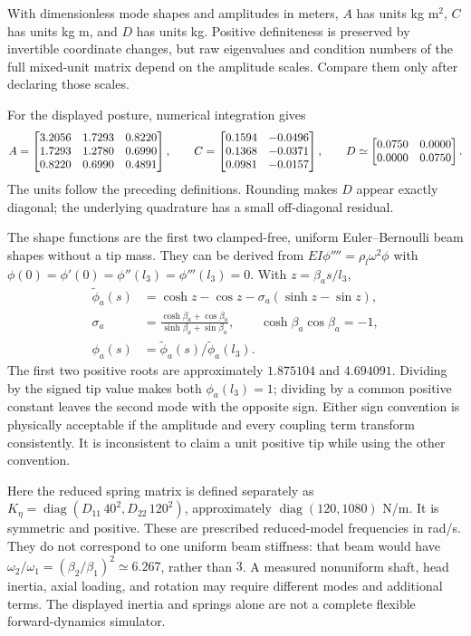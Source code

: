 With dimensionless mode shapes and amplitudes in meters, $A$ has units kg m$^2$, $C$ has units kg m, and $D$ has units kg. Positive definiteness is preserved by invertible coordinate changes, but raw eigenvalues and condition numbers of the full mixed-unit matrix depend on the amplitude scales. Compare them only after declaring those scales.

For the displayed posture, numerical integration gives
\begin{equation}
 A=\begin{bmatrix}3.2056 & 1.7293 & 0.8220 \\ 1.7293 & 1.2780 & 0.6990 \\ 0.8220 & 0.6990 & 0.4891\end{bmatrix},\qquad
 C=\begin{bmatrix}0.1594 & -0.0496 \\ 0.1368 & -0.0371 \\ 0.0981 & -0.0157\end{bmatrix},\qquad
 D\simeq\begin{bmatrix}0.0750 & 0.0000 \\ 0.0000 & 0.0750\end{bmatrix}.
\end{equation}
The units follow the preceding definitions. Rounding makes $D$ appear exactly diagonal; the underlying quadrature has a small off-diagonal residual.

The shape functions are the first two clamped-free, uniform Euler--Bernoulli beam shapes without a tip mass. They can be derived from $EI\phi''''=\rho_l\omega^2\phi$ with $\phi(0)=\phi'(0)=\phi''(l_3)=\phi'''(l_3)=0$. With $z=\beta_a s/l_3$,
\begin{equation}
\begin{aligned}
 \widetilde\phi_a(s)&=\cosh z-\cos z-\sigma_a(\sinh z-\sin z),\\
 \sigma_a&=\frac{\cosh\beta_a+\cos\beta_a}{\sinh\beta_a+\sin\beta_a},\qquad
 \cosh\beta_a\cos\beta_a=-1,\\
 \phi_a(s)&=\widetilde\phi_a(s)/\widetilde\phi_a(l_3).
\end{aligned}
\end{equation}
The first two positive roots are approximately $1.875104$ and $4.694091$. Dividing by the signed tip value makes both $\phi_a(l_3)=1$; dividing by a common positive constant leaves the second mode with the opposite sign. Either sign convention is physically acceptable if the amplitude and every coupling term transform consistently. It is inconsistent to claim a unit positive tip while using the other convention.

Here the reduced spring matrix is defined separately as $K_\eta=\operatorname{diag}(D_{11}\,40^2,D_{22}\,120^2)$, approximately $\operatorname{diag}(120,1080)$ N/m. It is symmetric and positive. These are prescribed reduced-model frequencies in rad/s. They do not correspond to one uniform beam stiffness: that beam would have $\omega_2/\omega_1=(\beta_2/\beta_1)^2\simeq6.267$, rather than $3$. A measured nonuniform shaft, head inertia, axial loading, and rotation may require different modes and additional terms. The displayed inertia and springs alone are not a complete flexible forward-dynamics simulator.

